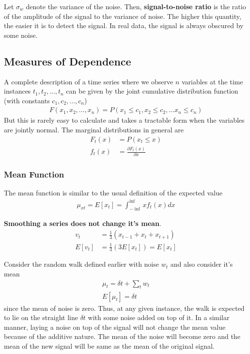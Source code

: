 \documentclass[../main.tex]{subfiles}
\begin{document}
    Let $\sigma_{w}$ denote the variance of the noise. Then, \textbf{signal-to-noise ratio} is the ratio of the amplitude of the signal to the variance of noise. The higher this quantity, the easier it is to detect the signal. In real data, the signal is always obscured by some noise.


    \subsection{Measures of Dependence}
    A complete description of a time series where we observe $n$ variables at the time instances $t_{1}, t_{2}, \ldots, t_{n}$ can be given by the joint cumulative distribution function (with constants $c_{1}, c_{2}, \ldots, c_{n}$)
    \begin{align*}
        F(x_{1}, x_{2}, \ldots, x_{n}) = P(x_{1} \leq c_{1}, x_{2} \leq c_{2}, \ldots x_{n} \leq c_{n})
    \end{align*}
    But this is rarely easy to calculate and takes a tractable form when the variables are jointly normal. The marginal distributions in general are
    \begin{align*}
        F_{t}(x) &= P(x_{t} \leq x)\\
        f_{t}(x) &= \frac{\partial F_{t}(x)}{\partial x}
    \end{align*}

    
    \subsubsection{Mean Function} \label{mean_fun}
    The mean function is similar to the usual definition of the expected value
    \begin{align*}
        \mu_{xt} = E[x_{t}] =  \int_{-\inf}^{\inf} x f_{t}(x) dx
    \end{align*}

    \textbf{Smoothing a series does not change it's mean}.
    \begin{align*}
        v_{t} &= \frac{1}{3}(x_{t-1} + x_{t} + x_{t+1})\\
        E[v_{t}] &= \frac{1}{3}(3E[x_{t}]) = E[x_{t}]
    \end{align*}

    Consider the random walk defined earlier with noise $w_{t}$ and also consider it's mean
    \begin{align*}
        \mu_{t} = \delta t + \sum_{t} w_{t}\\
        E[\mu_{t}] = \delta t
    \end{align*}
    since the mean of noise is zero. Thus, at any given instance, the walk is expected to lie on the straight line $\delta t$ with some noise added on top of it.\newline
    In a similar manner, laying a noise on top of the signal will not change the mean value because of the additive nature. The mean of the noise will become zero and the mean of the new signal will be same as the mean of the original signal.
\end{document}
